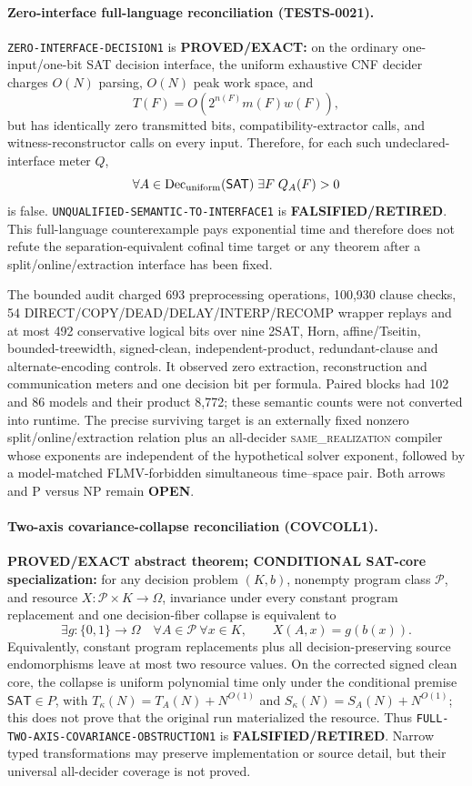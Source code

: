 \documentclass[11pt]{article}
\newcommand{\same}{\textnormal{\textsc{same\_realization}}}
\begin{document}
\paragraph{Zero-interface full-language reconciliation (TESTS-0021).}
\texttt{ZERO-INTERFACE-DECISION1} is \textbf{PROVED/EXACT:} on the ordinary one-input/one-bit SAT decision
interface, the uniform exhaustive CNF decider charges \(O(N)\) parsing,
\(O(N)\) peak work space, and
\[
 T(F)=O(2^{n(F)}m(F)w(F)),
\]
but has identically zero transmitted bits, compatibility-extractor calls, and
witness-reconstructor calls on every input.  Therefore, for each such
undeclared-interface meter \(Q\),
\[
 \forall A\in\operatorname{Dec}_{\rm uniform}(\mathsf{SAT})\;
 \exists F\;Q_A(F)>0
\]
is false.  \texttt{UNQUALIFIED-SEMANTIC-TO-INTERFACE1} is
\textbf{FALSIFIED/RETIRED}.  This full-language counterexample pays exponential
time and therefore does not refute the separation-equivalent cofinal time
target or any theorem after a split/online/extraction interface has been fixed.

The bounded audit charged 693 preprocessing operations, 100,930 clause
checks, 54 DIRECT/COPY/DEAD/DELAY/INTERP/RECOMP wrapper replays and at most
492 conservative logical bits over nine 2SAT, Horn, affine/Tseitin,
bounded-treewidth, signed-clean, independent-product, redundant-clause and
alternate-encoding controls.  It observed zero extraction, reconstruction and
communication meters and one decision bit per formula.  Paired blocks had 102
and 86 models and their product 8,772; these semantic counts were not converted
into runtime.  The precise surviving target is an externally fixed nonzero
split/online/extraction relation plus an all-decider \same{} compiler whose
exponents are independent of the hypothetical solver exponent, followed by a
model-matched FLMV-forbidden simultaneous time--space pair.  Both arrows and
P versus NP remain \textbf{OPEN}.


\paragraph{Two-axis covariance-collapse reconciliation (COVCOLL1).}
\textbf{PROVED/EXACT abstract theorem; CONDITIONAL SAT-core specialization:}
for any decision problem \((K,b)\), nonempty program class \(\mathcal P\), and
resource \(X:\mathcal P\times K\to\Omega\), invariance under every constant
program replacement and one decision-fiber collapse is equivalent to
\[
  \exists g:\{0,1\}\to\Omega\quad
  \forall A\in\mathcal P\ \forall x\in K,\qquad X(A,x)=g(b(x)).
\]
Equivalently, constant program replacements plus all decision-preserving
source endomorphisms leave at most two resource values.  On the corrected
signed clean core, the collapse is uniform polynomial time only under the
conditional premise \(\mathsf{SAT}\in P\), with
\(T_\kappa(N)=T_A(N)+N^{O(1)}\) and
\(S_\kappa(N)=S_A(N)+N^{O(1)}\); this does not prove that the original run
materialized the resource.  Thus
\texttt{FULL-TWO-AXIS-COVARIANCE-OBSTRUCTION1} is
\textbf{FALSIFIED/RETIRED}.  Narrow typed transformations may preserve
implementation or source detail, but their universal all-decider coverage is
not proved.
\end{document}
